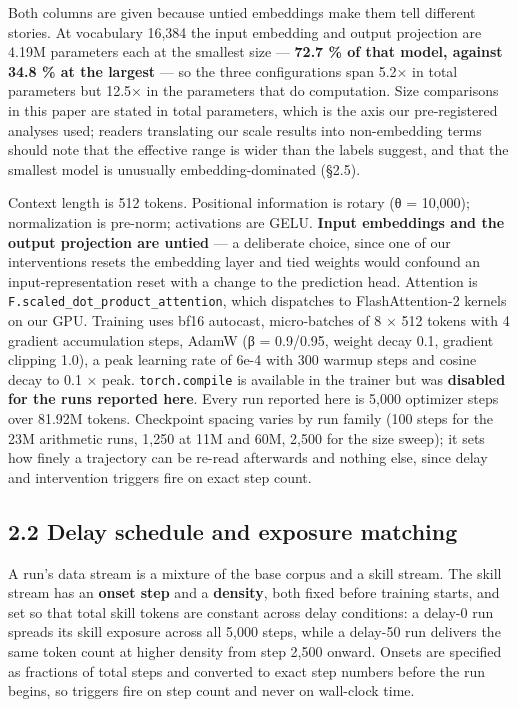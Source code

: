 \documentclass{article}
\begin{document}
Both columns are given because untied embeddings make them tell different stories. At
vocabulary 16,384 the input embedding and output projection are 4.19M parameters each at the
smallest size --- \textbf{72.7 \% of that model, against 34.8 \% at the largest} --- so the three
configurations span 5.2× in total parameters but 12.5× in the parameters that do computation.
Size comparisons in this paper are stated in total parameters, which is the axis our
pre-registered analyses used; readers translating our scale results into non-embedding terms
should note that the effective range is wider than the labels suggest, and that the smallest
model is unusually embedding-dominated (§2.5).

Context length is 512 tokens. Positional information is rotary (θ = 10,000); normalization is
pre-norm; activations are GELU. \textbf{Input embeddings and the output projection are untied} ---
a deliberate choice, since one of our interventions resets the embedding layer and tied
weights would confound an input-representation reset with a change to the prediction head.
Attention is \texttt{F.scaled\_dot\_product\_attention}, which dispatches to FlashAttention-2 kernels
on our GPU. Training uses bf16 autocast, micro-batches of 8 × 512 tokens with 4 gradient
accumulation steps, AdamW (β = 0.9/0.95, weight decay 0.1, gradient clipping 1.0), a peak
learning rate of 6e-4 with 300 warmup steps and cosine decay to 0.1 × peak. \texttt{torch.compile}
is available in the trainer but was \textbf{disabled for the runs reported here}. Every run
reported here is 5,000 optimizer steps over 81.92M tokens. Checkpoint spacing varies by run
family (100 steps for the 23M arithmetic runs, 1,250 at 11M and 60M, 2,500 for the size
sweep); it sets how finely a trajectory can be re-read afterwards and nothing else, since
delay and intervention triggers fire on exact step count.

\subsection{2.2 Delay schedule and exposure matching}\label{delay-schedule-and-exposure-matching}

A run's data stream is a mixture of the base corpus and a skill stream. The skill stream has
an \textbf{onset step} and a \textbf{density}, both fixed before training starts, and set so that total
skill tokens are constant across delay conditions: a delay-0 run spreads its skill exposure
across all 5,000 steps, while a delay-50 run delivers the same token count at higher density
from step 2,500 onward. Onsets are specified as fractions of total steps and converted to
exact step numbers before the run begins, so triggers fire on step count and never on
wall-clock time.
\end{document}
